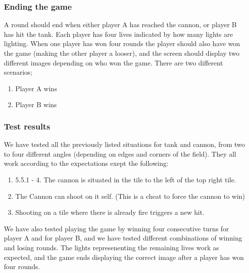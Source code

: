 \subsubsection{Ending the game}
A round should end when either player A has reached the cannon, or player B has hit the tank.
Each player has four lives indicated by how many lights are lighting. When one player has won
four rounds the player should also have won the game (making the other player a looser),
and the screen should display two different images depending on who won the game. There are
two different scenarios;
\begin{enumerate}
  \item Player A wins
  \item Player B wins
\end{enumerate}

\subsubsection{Test results}
We have tested all the previously listed situations for tank and cannon, from two to four
different angles (depending on edges and corners of the field). They all work
according to the expectations exept the following:
\begin{enumerate}
  \item 5.5.1 - 4. The cannon is situated in the tile to the left of the top right tile.
  \item The Cannon can shoot on it self. (This is a cheat to force the cannon to win)
  \item Shooting on a tile where there is already fire triggers a new hit.
\end{enumerate}

We have also tested playing the game by winning four consecutive turns for player A and for
player B, and we have tested different combinations of winning and losing rounds.
The lights represenenting the remaining lives work as expected, and the game ends displaying
the correct image after a player has won four rounds.
